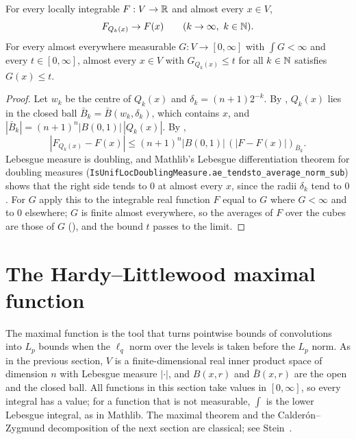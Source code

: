 \begin{theorem}
\label{thm:lebesgue-differentiation-cubes}
\leanok
{}
For every locally integrable $F : V \to \mathbb{R}$ and almost every $x \in V$,
\[
  F_{Q_k(x)} \to F(x) \qquad (k \to \infty, \ k \in \N) .
\]
For every almost everywhere measurable $G : V \to [0, \infty]$ with $\int G < \infty$ and every
$t \in [0, \infty]$, almost every $x \in V$ with $G_{Q_k(x)} \leq t$ for all $k \in \mathbb{N}$
satisfies $G(x) \leq t$.
\end{theorem}

\begin{proof}
\leanok
Let $w_k$ be the centre of $Q_k(x)$ and $\delta_k = (n + 1) 2^{-k}$. By ,
$Q_k(x)$ lies in the closed ball $\bar B_k = \bar B(w_k, \delta_k)$, which contains $x$, and
$|\bar B_k| = (n + 1)^n |B(0,1)| \, |Q_k(x)|$. By ,
\[
  |F_{Q_k(x)} - F(x)| \leq (n + 1)^n |B(0,1)| \, (|F - F(x)|)_{\bar B_k} .
\]
Lebesgue measure is doubling, and Mathlib's Lebesgue differentiation theorem for doubling
measures (\texttt{IsUnifLocDoublingMeasure.\allowbreak ae\_tendsto\_average\_norm\_sub}) shows
that the right side tends to $0$ at almost every $x$, since the radii $\delta_k$ tend to $0$.
For $G$ apply this to the integrable real function $F$ equal to $G$ where $G < \infty$ and to $0$
elsewhere; $G$ is finite almost everywhere, so the averages of $F$ over the cubes are those of $G$
(), and the bound $t$ passes to the limit.
\end{proof}

\section{The Hardy--Littlewood maximal function}

The maximal function is the tool that turns pointwise bounds of convolutions into $L_p$ bounds
when the $\ell_q$ norm over the levels is taken before the $L_p$ norm. As in the previous section,
$V$ is a finite-dimensional real inner product space of dimension $n$ with Lebesgue measure
$|\cdot|$, and $B(x, r)$ and $\bar B(x, r)$ are the open and the closed ball. All functions in
this section take values in $[0, \infty]$, so every integral has a value; for a function that
is not measurable, $\int$ is the lower Lebesgue integral, as in Mathlib. The maximal theorem and
the Calder\'on--Zygmund decomposition of the next section are classical; see
Stein~\cite{Stein}.

